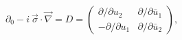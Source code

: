 \begin{equation}
\partial_{0}-i~\vec{\sigma} \cdot \vec{\nabla}=D= \left(
\begin{array}{cc}
\partial / \partial u_{2}  & \partial /\partial \bar{u}_{1} \\
-\partial / \partial u_{1}  & \partial / \partial \bar{u}_{2}
\end{array}
\right),
\end{equation}

